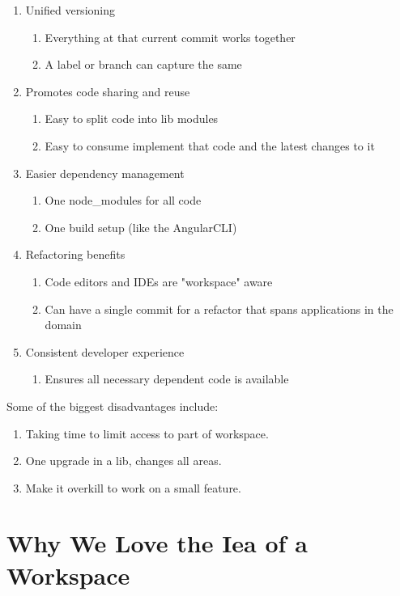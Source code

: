\begin{enumerate}
  \item Unified versioning
    \begin{enumerate}
      \item Everything at that current commit works together
      \item A label or branch can capture the same
    \end{enumerate}
  \item Promotes code sharing and reuse
    \begin{enumerate}
      \item Easy to split code into lib modules
      \item Easy to consume implement that code and the latest changes to it
    \end{enumerate}
  \item Easier dependency management
    \begin{enumerate}
      \item One node\_modules for all code
      \item One build setup (like the AngularCLI)
    \end{enumerate}
  \item Refactoring benefits
    \begin{enumerate}
      \item Code editors and IDEs are "workspace" aware
      \item Can have a single commit for a refactor that spans applications in the domain
    \end{enumerate}
  \item Consistent developer experience
    \begin{enumerate}
      \item Ensures all necessary dependent code is available
    \end{enumerate}
\end{enumerate}

Some of the biggest disadvantages include:
\begin{enumerate}
  \item Taking time to limit access to part of workspace.
  \item One upgrade in a lib, changes all areas.
  \item Make it overkill to work on a small feature.
\end{enumerate}

\section{Why We Love the Iea of a Workspace}

